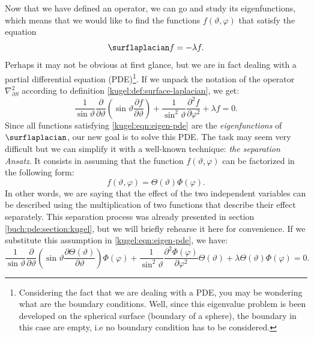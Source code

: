 Now that we have defined an operator, we can go and study its eigenfunctions,
which means that we would like to find the functions $f(\vartheta, \varphi)$
that satisfy the equation
\begin{equation} \label{kugel:eqn:eigen}
    \surflaplacian f = -\lambda f.
\end{equation}
Perhaps it may not be obvious at first glance, but we are in fact dealing with a
partial differential equation (PDE)\footnote{Considering the fact that we are
dealing with a PDE, you may be wondering what are the boundary conditions. Well,
since this eigenvalue problem is been developed on the spherical surface
(boundary of a sphere), the boundary in this case are empty, i.e no boundary
condition has to be considered.}. If we unpack the notation of the operator
$\nabla^2_{\partial S}$ according to definition
\ref{kugel:def:surface-laplacian}, we get:
\begin{equation} \label{kugel:eqn:eigen-pde}
    \frac{1}{\sin\vartheta} \frac{\partial}{\partial \vartheta} \left(
      \sin\vartheta \frac{\partial f}{\partial\vartheta}
    \right)
    + \frac{1}{\sin^2 \vartheta} \frac{\partial^2 f}{\partial\varphi^2}
    + \lambda f = 0.
\end{equation}
Since all functions satisfying \eqref{kugel:eqn:eigen-pde} are the
\emph{eigenfunctions} of $\surflaplacian$, our new goal is to solve this PDE.
The task may seem very difficult but we can simplify it with a well-known
technique: \emph{the separation Ansatz}. It consists in assuming that the
function $f(\vartheta, \varphi)$ can be factorized in the following form:
\begin{equation}
    f(\vartheta, \varphi) = \Theta(\vartheta)\Phi(\varphi). 
\end{equation}
In other words, we are saying that the effect of the two independent variables
can be described using the multiplication of two functions that describe their
effect separately. This separation process was already presented in section
\ref{buch:pde:section:kugel}, but we will briefly rehearse it here for
convenience. If we substitute this assumption in
\eqref{kugel:eqn:eigen-pde}, we have:
\begin{equation*}
    \frac{1}{\sin\vartheta} \frac{\partial}{\partial \vartheta} \left(
      \sin\vartheta \frac{\partial  \Theta(\vartheta)}{\partial\vartheta}
    \right) \Phi(\varphi)
    + \frac{1}{\sin^2 \vartheta}
      \frac{\partial^2 \Phi(\varphi)}{\partial\varphi^2}
      \Theta(\vartheta)
    + \lambda \Theta(\vartheta)\Phi(\varphi) = 0.
\end{equation*}
